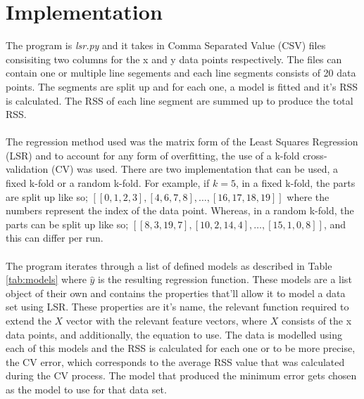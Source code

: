 \documentclass[a4paper,11pt]{article}
\begin{document}
\section{Implementation}
The program is \textit{lsr.py} and it takes in Comma Separated Value (CSV) files
consisiting two columns for the x and y data points respectively. The files can
contain one or multiple line segements and each line segments consists of 20
data points. The segments are split up and for each one, a model is fitted
and it's RSS is calculated. The RSS of each line segment are summed up to
produce the total RSS.
\\ \\
The regression method used was the matrix form of the Least Squares Regression (LSR)
and to account for any form of overfitting, the use of a k-fold cross-validation (CV)
was used. There are two implementation that can be used, a fixed k-fold
or a random k-fold. For example, if $k = 5$, in a fixed k-fold, the parts are split up
like so; $[[0, 1, 2, 3], [4, 6, 7, 8], \dots, [16, 17, 18, 19]]$ where the
numbers represent the index of the data point. Whereas, in a random k-fold, the parts
can be split up like so; $[[8, 3, 19, 7], [10, 2, 14, 4], \dots, [15, 1, 0, 8]]$,
and this can differ per run. 
\\ \\
The program iterates through a list of defined models as described in Table
\ref{tab:models} where $\hat{y}$ is the resulting regression function. These
models are a list object of their own and contains the properties that'll allow it
to model a data set using LSR. These properties are it's name, the relevant function required
to extend the $X$ vector with the relevant feature vectors, where $X$ consists of the x
data points, and additionally, the equation to use. The data is modelled using
each of this models and the RSS is calculated for each one or to be more precise,
the CV error, which corresponds to the average RSS value that was calculated
during the CV process.  The model that produced the minimum error gets chosen
as the model to use for that data set.
\end{document}
